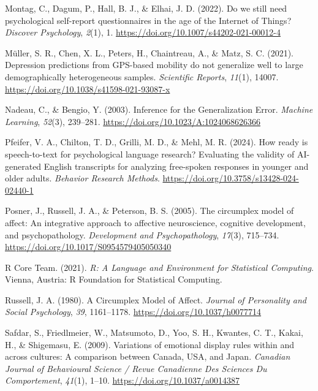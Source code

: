\documentclass[
  english,
  man,floatsintext]{apa6}
\newlength{\cslhangindent}
\newenvironment{CSLReferences}[2] %
 {%
  \setlength{\parindent}{0pt}
  \ifodd #1 \everypar{\setlength{\hangindent}{\cslhangindent}}\ignorespaces\fi
  \ifnum #2 > 0
  \setlength{\parskip}{#2\baselineskip}
  \fi
 }%
 {}
\begin{document}
\begin{CSLReferences}{1}{0}
\leavevmode{}%
Montag, C., Dagum, P., Hall, B. J., \& Elhai, J. D. (2022). Do we still need psychological self-report questionnaires in the age of the {Internet} of {Things}? \emph{Discover Psychology}, \emph{2}(1), 1. \url{https://doi.org/10.1007/s44202-021-00012-4}

\leavevmode{}%
Müller, S. R., Chen, X. L., Peters, H., Chaintreau, A., \& Matz, S. C. (2021). Depression predictions from {GPS-based} mobility do not generalize well to large demographically heterogeneous samples. \emph{Scientific Reports}, \emph{11}(1), 14007. \url{https://doi.org/10.1038/s41598-021-93087-x}

\leavevmode{}%
Nadeau, C., \& Bengio, Y. (2003). Inference for the {Generalization Error}. \emph{Machine Learning}, \emph{52}(3), 239--281. \url{https://doi.org/10.1023/A:1024068626366}

\leavevmode{}%
Pfeifer, V. A., Chilton, T. D., Grilli, M. D., \& Mehl, M. R. (2024). How ready is speech-to-text for psychological language research? {Evaluating} the validity of {AI-generated English} transcripts for analyzing free-spoken responses in younger and older adults. \emph{Behavior Research Methods}. \url{https://doi.org/10.3758/s13428-024-02440-1}

\leavevmode{}%
Posner, J., Russell, J. A., \& Peterson, B. S. (2005). The circumplex model of affect: {An} integrative approach to affective neuroscience, cognitive development, and psychopathology. \emph{Development and Psychopathology}, \emph{17}(3), 715--734. \url{https://doi.org/10.1017/S0954579405050340}

\leavevmode{}%
R Core Team. (2021). \emph{R: {A Language} and {Environment} for {Statistical Computing}}. Vienna, Austria: R Foundation for Statistical Computing.

\leavevmode{}%
Russell, J. A. (1980). A {Circumplex Model} of {Affect}. \emph{Journal of Personality and Social Psychology}, \emph{39}, 1161--1178. \url{https://doi.org/10.1037/h0077714}

\leavevmode{}%
Safdar, S., Friedlmeier, W., Matsumoto, D., Yoo, S. H., Kwantes, C. T., Kakai, H., \& Shigemasu, E. (2009). Variations of emotional display rules within and across cultures: {A} comparison between {Canada}, {USA}, and {Japan}. \emph{Canadian Journal of Behavioural Science / Revue Canadienne Des Sciences Du Comportement}, \emph{41}(1), 1--10. \url{https://doi.org/10.1037/a0014387}


\end{CSLReferences}
\end{document}
